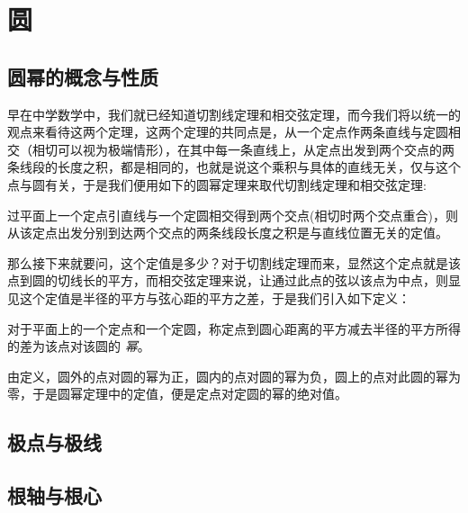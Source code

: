 
\section{圆}
\label{sec:circle}

\subsection{圆幂的概念与性质}
\label{sec:power-of-circle}

早在中学数学中，我们就已经知道切割线定理和相交弦定理，而今我们将以统一的观点来看待这两个定理，这两个定理的共同点是，从一个定点作两条直线与定圆相交（相切可以视为极端情形），在其中每一条直线上，从定点出发到两个交点的两条线段的长度之积，都是相同的，也就是说这个乘积与具体的直线无关，仅与这个点与圆有关，于是我们便用如下的圆幂定理来取代切割线定理和相交弦定理:

\begin{theorem}[圆幂定理]
  过平面上一个定点引直线与一个定圆相交得到两个交点(相切时两个交点重合)，则从该定点出发分别到达两个交点的两条线段长度之积是与直线位置无关的定值。
\end{theorem}

那么接下来就要问，这个定值是多少？对于切割线定理而来，显然这个定点就是该点到圆的切线长的平方，而相交弦定理来说，让通过此点的弦以该点为中点，则显见这个定值是半径的平方与弦心距的平方之差，于是我们引入如下定义：

\begin{definition}
  对于平面上的一个定点和一个定圆，称定点到圆心距离的平方减去半径的平方所得的差为该点对该圆的 \emph{幂}。
\end{definition}

由定义，圆外的点对圆的幂为正，圆内的点对圆的幂为负，圆上的点对此圆的幂为零，于是圆幂定理中的定值，便是定点对定圆的幂的绝对值。

\subsection{极点与极线}
\label{sec:pole-and-polar}


\subsection{根轴与根心}
\label{sec:radical-axis-and-center}





